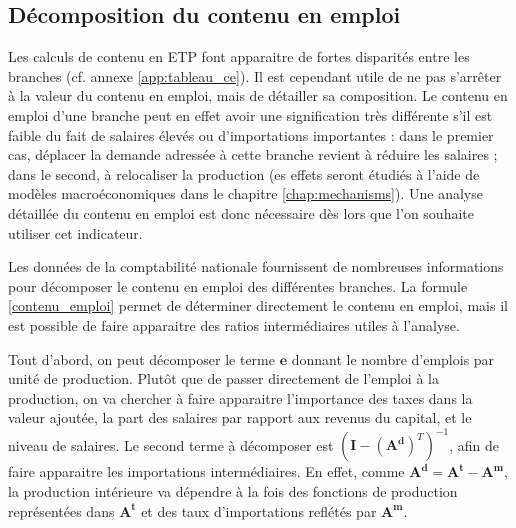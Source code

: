 \subsection{Décomposition du contenu en emploi}

Les calculs de contenu en ETP font apparaitre de fortes disparités entre les branches (cf. annexe \ref{app:tableau_ce}). Il est cependant utile de ne pas s’arrêter à la valeur du contenu en emploi, mais de détailler sa composition. Le contenu en emploi d’une branche peut en effet avoir une signification très différente s’il est faible du fait de salaires élevés ou d’importations importantes : dans le premier cas, déplacer la demande adressée à cette branche revient à réduire les salaires ; dans le second, à relocaliser la production (es effets seront étudiés à l'aide de modèles macroéconomiques dans le chapitre \ref{chap:mechanisms}).  Une analyse détaillée du contenu en emploi est donc nécessaire dès lors que l’on souhaite utiliser cet indicateur.

Les données de la comptabilité nationale fournissent de nombreuses informations pour décomposer le contenu en emploi des différentes branches. La formule \ref{contenu_emploi} permet de déterminer directement le contenu en emploi, mais il est possible de faire apparaitre des ratios intermédiaires utiles à l'analyse.

Tout d'abord, on peut décomposer le terme $\pmb{e}$ donnant le nombre d'emplois par unité de production. Plutôt que de passer directement de l'emploi à la production, on va chercher à faire apparaitre l'importance des taxes dans la valeur ajoutée, la part des salaires par rapport aux revenus du capital, et le niveau de salaires.
Le second terme à décomposer est $(\pmb{I} - (\pmb{A^d})^T)^{-1}$, afin de faire apparaitre les importations intermédiaires. En effet, comme $\pmb{A^d} = \pmb{A^t} - \pmb{A^m}$, la production intérieure va dépendre à la fois des fonctions de production représentées dans $\pmb{A^t}$ et des taux d'importations reflétés par $\pmb{A^m}$.

